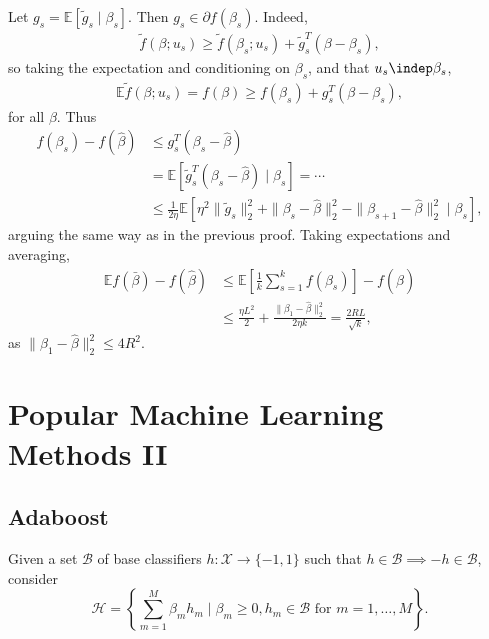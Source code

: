 \documentclass[12pt]{article}
\begin{document}
\begin{proofbox}
	Let $g_s = \mathbb{E}[\tilde g_s \mid \beta_s]$. Then $g_s \in \partial f(\beta_s)$. Indeed,
	\begin{align*}
		\tilde f(\beta; u_s) \geq \tilde f(\beta_s; u_s) + \tilde g_s^T (\beta - \beta_s),
	\end{align*}
	so taking the expectation and conditioning on $\beta_s$, and that $u_s \indep \beta_s$,
	\begin{align*}
		\mathbb{E} \tilde f(\beta; u_s) = f(\beta) \geq f(\beta_s) + g_s^T (\beta - \beta_s),
	\end{align*}
	for all $\beta$. Thus
	\begin{align*}
		f(\beta_s) - f(\hat \beta) &\leq g_s^T(\beta_s - \hat \beta) \\
					   &= \mathbb{E}[ \tilde g_s^T(\beta_s - \hat \beta) \mid \beta_s] = \cdots \\
					   &\leq \frac{1}{2 \eta} \mathbb{E}[\eta^2 \|\tilde g_s\|_2^2 + \|\beta_s - \hat \beta\|_2^2 - \|\beta_{s+1} - \hat \beta\|_2^2 \mid \beta_s],
	\end{align*}
	arguing the same way as in the previous proof. Taking expectations and averaging,
	\begin{align*}
		\mathbb{E} f(\bar \beta) - f(\hat \beta) &\leq \mathbb{E}\left[ \frac{1}{k}\sum_{s = 1}^k f(\beta_s)\right] - f(\hat \beta) \\
					 &\leq \frac{\eta L^2}{2} + \frac{\|\beta_1 - \hat \beta\|_2^2}{2 \eta k} = \frac{2RL}{\sqrt k},
	\end{align*}
	as $\|\beta_1 - \hat \beta\|_2^2 \leq 4R^2$.
\end{proofbox}

\newpage

\section{Popular Machine Learning Methods II}
\label{sec:pop}

\subsection{Adaboost}
\label{sub:adb}

Given a set $\mathcal{B}$ of base classifiers $h : \mathcal{X} \to \{-1, 1\}$ such that $h \in \mathcal{B} \implies -h \in \mathcal{B}$, consider
\[
	\mathcal{H} = \left\{ \sum_{m = 1}^M \beta_m h_m \mid \beta_m \geq 0, h_m \in \mathcal{B} \text{ for } m = 1, \ldots, M\right\}.
\]
\end{document}
